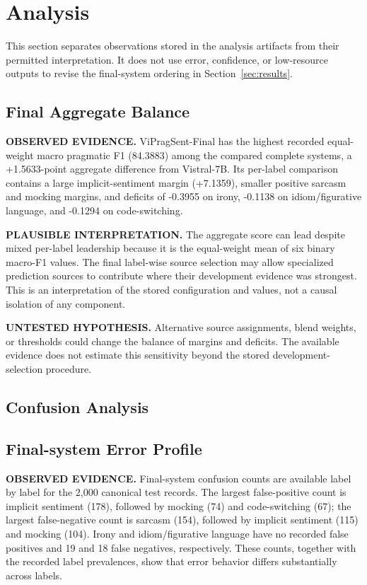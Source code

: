 \section{Analysis}
\label{sec:analysis}

This section separates observations stored in the analysis artifacts from their permitted interpretation.  It does not use error, confidence, or low-resource outputs to revise the final-system ordering in Section~\ref{sec:results}.

\subsection{Final Aggregate Balance}

\textbf{OBSERVED EVIDENCE.} ViPragSent-Final has the highest recorded equal-weight macro pragmatic F1 (84.3883) among the compared complete systems, a +1.5633-point aggregate difference from Vistral-7B.  Its per-label comparison contains a large implicit-sentiment margin (+7.1359), smaller positive sarcasm and mocking margins, and deficits of -0.3955 on irony, -0.1138 on idiom/figurative language, and -0.1294 on code-switching.

\textbf{PLAUSIBLE INTERPRETATION.} The aggregate score can lead despite mixed per-label leadership because it is the equal-weight mean of six binary macro-F1 values.  The final label-wise source selection may allow specialized prediction sources to contribute where their development evidence was strongest.  This is an interpretation of the stored configuration and values, not a causal isolation of any component.

\textbf{UNTESTED HYPOTHESIS.} Alternative source assignments, blend weights, or thresholds could change the balance of margins and deficits.  The available evidence does not estimate this sensitivity beyond the stored development-selection procedure.

\subsection{Confusion Analysis}

\subsection{Final-system Error Profile}

\textbf{OBSERVED EVIDENCE.} Final-system confusion counts are available label by label for the 2,000 canonical test records. The largest false-positive count is implicit sentiment (178), followed by mocking (74) and code-switching (67); the largest false-negative count is sarcasm (154), followed by implicit sentiment (115) and mocking (104). Irony and idiom/figurative language have no recorded false positives and 19 and 18 false negatives, respectively. These counts, together with the recorded label prevalences, show that error behavior differs substantially across labels.

